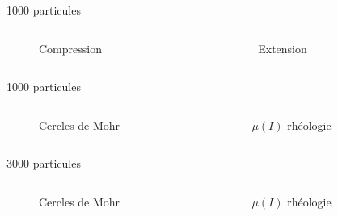 \documentclass[10pt]{beamer}
\begin{document}
\begin{frame}{1000 particules}
    \begin{columns}
        \begin{column}{0.5\textwidth}
            \begin{figure}[h]
                \centering
                \scalebox{0.5}{}
                \caption{Compression}
            \end{figure}
        \end{column}
        \begin{column}{0.5\textwidth}
            \begin{figure}[h]
                \centering
                \scalebox{0.5}{}
                \caption{Extension}
            \end{figure}
        \end{column}
    \end{columns}
\end{frame}

\begin{frame}{1000 particules}
    \begin{columns}
        \begin{column}{0.5\textwidth}
            \begin{figure}[h]
                \centering
                \scalebox{0.4}{}
                \caption{Cercles de Mohr}
            \end{figure}
        \end{column}
        \begin{column}{0.5\textwidth}
            \begin{figure}[h]
                \centering
                \scalebox{0.5}{}
                \caption{$\mu(I)$ rhéologie}
            \end{figure}
        \end{column}
    \end{columns}
\end{frame}

\begin{frame}{3000 particules}
    \begin{columns}
        \begin{column}{0.5\textwidth}
            \begin{figure}[h]
                \centering
                \scalebox{0.4}{}
                \caption{Cercles de Mohr}
            \end{figure}
        \end{column}
        \begin{column}{0.5\textwidth}
            \begin{figure}[h]
                \centering
                \scalebox{0.5}{}
                \caption{$\mu(I)$ rhéologie}
            \end{figure}
        \end{column}
    \end{columns}
\end{frame}
\end{document}
